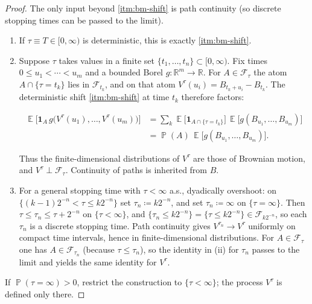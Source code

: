 \documentclass[11pt,a4paper]{article}
\DeclareMathOperator{\E}{\mathbb{E}}
\DeclareMathOperator{\Pbb}{\mathbb{P}}
\begin{document}
\begin{proof}
The only input beyond \cref{itm:bm-shift} is path continuity (so discrete stopping times can be passed to the limit).
\begin{enumerate}[label=\textup{(\roman*)}]
    \item
    If \(\tau\equiv T\in[0,\infty)\) is deterministic, this is exactly \cref{itm:bm-shift}.
    \item
    Suppose \(\tau\) takes values in a finite set \(\{t_{1},\dots,t_{n}\}\subset[0,\infty)\). Fix times \(0\le u_{1}<\cdots<u_{m}\) and a bounded Borel \(g:\mathbb{R}^{m}\to\mathbb{R}\). For \(A\in\mathcal{F}_{\tau}\) the atom \(A\cap\{\tau=t_{k}\}\) lies in \(\mathcal{F}_{t_{k}}\), and on that atom \(V^{\tau}(u_{i})=B_{t_{k}+u_{i}}-B_{t_{k}}\). The deterministic shift \cref{itm:bm-shift} at time \(t_{k}\) therefore factors:

\[
\begin{aligned}
\E\bigl[\mathbf{1}_{A}\,g\bigl(V^{\tau}(u_{1}),\dots,V^{\tau}(u_{m})\bigr)\bigr]
&=
\sum_{k}
\E\bigl[\mathbf{1}_{A\cap\{\tau=t_{k}\}}\bigr]
\,
\E\bigl[g(B_{u_{1}},\dots,B_{u_{m}})\bigr]\\
&=
\Pbb(A)\,
\E\bigl[g(B_{u_{1}},\dots,B_{u_{m}})\bigr].
\end{aligned}
\]

Thus the finite-dimensional distributions of \(V^{\tau}\) are those of Brownian motion, and \(V^{\tau}\perp\mathcal{F}_{\tau}\). Continuity of paths is inherited from \(B\).
    \item
    For a general stopping time with \(\tau<\infty\) a.s., dyadically overshoot: on \(\{(k-1)2^{-n}<\tau\le k2^{-n}\}\) set \(\tau_{n}\coloneqq k2^{-n}\), and set \(\tau_{n}\coloneqq\infty\) on \(\{\tau=\infty\}\). Then \(\tau\le\tau_{n}\le\tau+2^{-n}\) on \(\{\tau<\infty\}\), and \(\{\tau_{n}\le k2^{-n}\}=\{\tau\le k2^{-n}\}\in\mathcal{F}_{k2^{-n}}\), so each \(\tau_{n}\) is a discrete stopping time. Path continuity gives \(V^{\tau_{n}}\to V^{\tau}\) uniformly on compact time intervals, hence in finite-dimensional distributions. For \(A\in\mathcal{F}_{\tau}\) one has \(A\in\mathcal{F}_{\tau_{n}}\) (because \(\tau\le\tau_{n}\)), so the identity in (ii) for \(\tau_{n}\) passes to the limit and yields the same identity for \(V^{\tau}\).
\end{enumerate}
If \(\Pbb(\tau=\infty)>0\), restrict the construction to \(\{\tau<\infty\}\); the process \(V^{\tau}\) is defined only there.
\end{proof}
\end{document}
